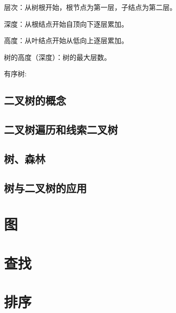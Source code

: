 \documentclass{ctexart}
\begin{document}
层次：从树根开始，根节点为第一层，子结点为第二层。

深度：从根结点开始自顶向下逐层累加。

高度：从叶结点开始从低向上逐层累加。

树的高度（深度）：树的最大层数。

有序树:

\subsection{二叉树的概念}

\subsection{二叉树遍历和线索二叉树}

\subsection{树、森林}

\subsection{树与二叉树的应用}

\section{图}

\section{查找}

\section{排序}

\subsection{}
\end{document}

